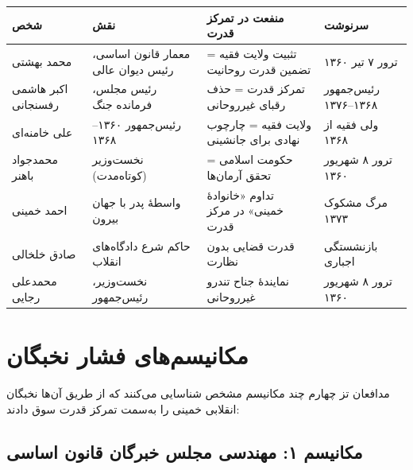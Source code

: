 \begin{principleBox}
\begin{longtable}{%
    >{\raggedleft\arraybackslash}p{}
    >{\raggedleft\arraybackslash}p{}
    >{\raggedleft\arraybackslash}p{}
    >{\raggedleft\arraybackslash}p{}}
\toprule
\rowcolor{cConsolid!10}
\textbf{شخص} & \textbf{نقش} & \textbf{منفعت در تمرکز قدرت} & \textbf{سرنوشت} \\
\midrule
\endhead

محمد بهشتی &
معمار قانون اساسی، رئیس دیوان عالی &
تثبیت ولایت فقیه = تضمین قدرت روحانیت &
ترور ۷ تیر ۱۳۶۰ \\
\midrule

اکبر هاشمی رفسنجانی &
رئیس مجلس، فرمانده جنگ &
تمرکز قدرت = حذف رقبای غیرروحانی &
رئیس‌جمهور ۱۳۶۸–۱۳۷۶ \\
\midrule

علی خامنه‌ای &
رئیس‌جمهور ۱۳۶۰–۱۳۶۸ &
ولایت فقیه = چارچوب نهادی برای جانشینی &
ولی فقیه از ۱۳۶۸ \\
\midrule

محمدجواد باهنر &
نخست‌وزیر (کوتاه‌مدت) &
حکومت اسلامی = تحقق آرمان‌ها &
ترور ۸ شهریور ۱۳۶۰ \\
\midrule

احمد خمینی &
واسطهٔ پدر با جهان بیرون &
تداوم «خانوادهٔ خمینی» در مرکز قدرت &
مرگ مشکوک ۱۳۷۳ \\
\midrule

صادق خلخالی &
حاکم شرع دادگاه‌های انقلاب &
قدرت قضایی بدون نظارت &
بازنشستگی اجباری \\
\midrule

محمدعلی رجایی &
نخست‌وزیر، رئیس‌جمهور &
نمایندهٔ جناح تندرو غیرروحانی &
ترور ۸ شهریور ۱۳۶۰ \\

\bottomrule
\end{longtable}
\end{principleBox}

\section{مکانیسم‌های فشار نخبگان}

مدافعان تز چهارم چند مکانیسم مشخص شناسایی می‌کنند که از طریق آن‌ها نخبگان انقلابی خمینی را به‌سمت تمرکز قدرت سوق دادند:

\subsection{مکانیسم ۱: مهندسی مجلس خبرگان قانون اساسی}

